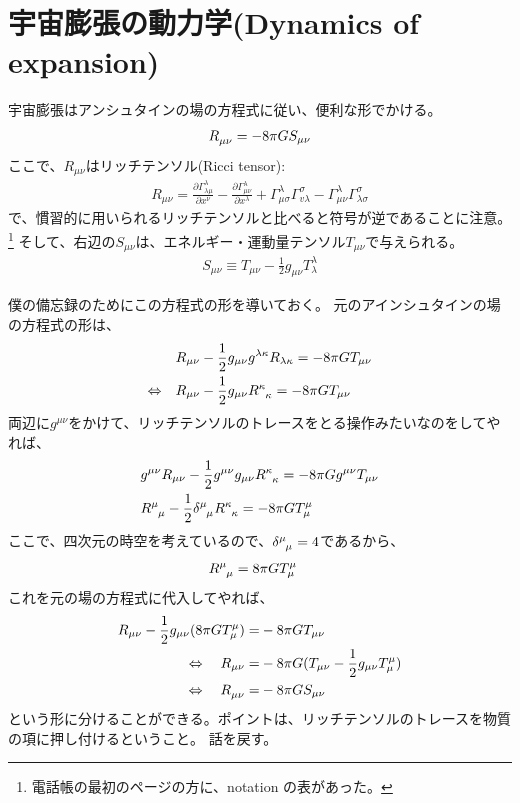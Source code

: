 \documentclass[11pt]{ltjsarticle}
\theoremstyle{plain}
\theoremstyle{break}
\begin{document}
\section{宇宙膨張の動力学(Dynamics of expansion)}\label{sec:1.5Dynamics-of-expansion}
宇宙膨張はアンシュタインの場の方程式に従い、便利な形でかける。
\begin{align}
  \tensor{R}{_{\mu \nu}} = -8\pi G S_{\mu \nu}
\end{align}
ここで、$R_{\mu\nu}$はリッチテンソル(Ricci tensor):
\begin{align}
  R_{\mu \nu}=\frac{\partial \Gamma_{\lambda \mu}^{\lambda}}{\partial x^{\nu}}-\frac{\partial \Gamma_{\mu \nu}^{\lambda}}{\partial x^{\lambda}}+\Gamma_{\mu \sigma}^{\lambda} \Gamma_{v \lambda}^{\sigma}-\Gamma_{\mu \nu}^{\lambda} \Gamma_{\lambda \sigma}^{\sigma}
\end{align}
で、慣習的に用いられるリッチテンソルと比べると符号が逆であることに注意。\footnote{電話帳の最初のページの方に、notation の表があった。}
そして、右辺の$S_{\mu\nu}$は、エネルギー・運動量テンソル$T_{\mu\nu}$で与えられる。
\begin{align}
  S_{\mu \nu} \equiv T_{\mu \nu}-\frac{1}{2} g_{\mu \nu} T_{\lambda}^{\lambda}
\end{align}

僕の備忘録のためにこの方程式の形を導いておく。
元のアインシュタインの場の方程式の形は、
\begin{align}
  &R_{\mu \nu}-\frac{1}{2} g_{\mu \nu} g^{\lambda \kappa} R_{\lambda \kappa}=-8 \pi G T_{\mu \nu} \\
  \Leftrightarrow \quad  & R_{\mu \nu}-\frac{1}{2} g_{\mu \nu} \tensor{R}{^\kappa _\kappa}=-8 \pi G T_{\mu \nu}
\end{align}
両辺に$g^{\mu \nu}$をかけて、リッチテンソルのトレースをとる操作みたいなのをしてやれば、
\begin{align}
  & g^{\mu \nu} R_{\mu \nu}-\frac{1}{2} g^{\mu \nu} g_{\mu \nu} \tensor{R}{^\kappa _\kappa}=-8 \pi G g^{\mu \nu} T_{\mu \nu} \\
  & \tensor{R}{^{\mu} _{\mu}}-\frac{1}{2}  \tensor{\delta}{^\mu _\mu} \tensor{R}{^{\kappa} _{\kappa}}=-8 \pi G T^{\mu}_{\mu}
\end{align}
ここで、四次元の時空を考えているので、$ \tensor{\delta}{^\mu _\mu} = 4$であるから、
\begin{align}
&\tensor{R}{^{\mu} _{\mu}} =  8 \pi G T^{\mu}_{\mu}
\end{align}
これを元の場の方程式に代入してやれば、
\begin{align}
  R_{\mu \nu}-\frac{1}{2} g_{\mu \nu} (8 \pi G T^{\mu}_{\mu} ) =&-8 \pi G T_{\mu \nu} \\
  \Leftrightarrow  \quad
  R_{\mu \nu}=&-8 \pi G (T_{\mu \nu} -\frac{1}{2} g_{\mu \nu}  T^{\mu}_{\mu} )\\
  \Leftrightarrow  \quad
    \tensor{R}{_{\mu \nu}} =& -8\pi G S_{\mu \nu}
\end{align}%
という形に分けることができる。ポイントは、リッチテンソルのトレースを物質の項に押し付けるということ。
話を戻す。
\end{document}
